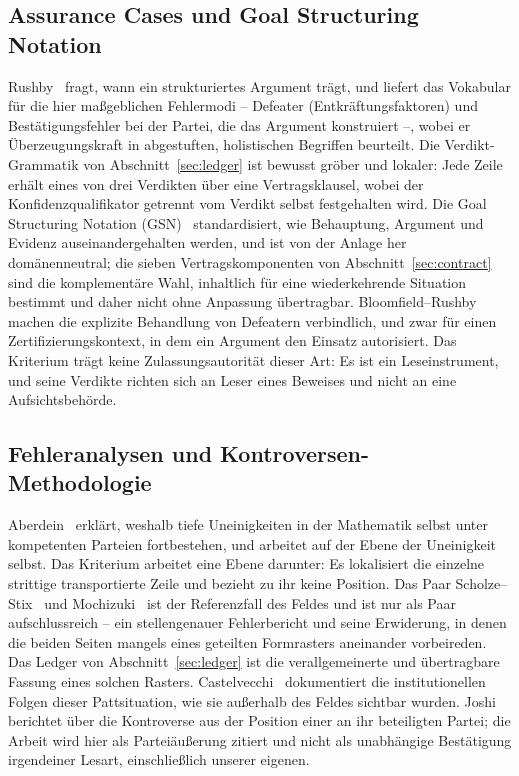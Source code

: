 \documentclass[11pt,a4paper]{article}
\begin{document}
\subsection{Assurance Cases und Goal Structuring Notation}\label{sec:related-assurance}

Rushby~\cite{Rushby2015} fragt, wann ein strukturiertes Argument trägt, und
liefert das Vokabular für die hier maßgeblichen Fehlermodi -- Defeater (Entkräftungsfaktoren) und
Bestätigungsfehler bei der Partei, die das Argument konstruiert --, wobei er
Überzeugungskraft in abgestuften, holistischen Begriffen beurteilt. Die
Verdikt-Grammatik von Abschnitt~\ref{sec:ledger} ist bewusst gröber und
lokaler: Jede Zeile erhält eines von drei Verdikten über eine
Vertragsklausel, wobei der Konfidenzqualifikator getrennt vom Verdikt selbst
festgehalten wird. Die Goal Structuring Notation (GSN)~\cite{GSN2021}
standardisiert, wie Behauptung, Argument und Evidenz auseinandergehalten
werden, und ist von der Anlage her domänenneutral; die sieben
Vertragskomponenten von Abschnitt~\ref{sec:contract} sind die komplementäre
Wahl, inhaltlich für eine wiederkehrende Situation bestimmt und daher nicht
ohne Anpassung übertragbar. Bloomfield--Rushby~\cite{Bloomfield2021} machen
die explizite Behandlung von Defeatern verbindlich, und zwar für einen
Zertifizierungskontext, in dem ein Argument den Einsatz autorisiert. Das
Kriterium trägt keine Zulassungsautorität dieser Art: Es ist ein
Leseinstrument, und seine Verdikte richten sich an Leser eines Beweises und
nicht an eine Aufsichtsbehörde.

\subsection{Fehleranalysen und Kontroversen-Methodologie}\label{sec:related-controversy}

Aberdein~\cite{Aberdein2023} erklärt, weshalb tiefe Uneinigkeiten in der
Mathematik selbst unter kompetenten Parteien fortbestehen, und arbeitet auf
der Ebene der Uneinigkeit selbst. Das Kriterium arbeitet eine Ebene darunter:
Es lokalisiert die einzelne strittige transportierte Zeile und bezieht zu ihr
keine Position. Das Paar Scholze--Stix~\cite{ScholzeStix2018} und
Mochizuki~\cite{Mochizuki2019} ist der Referenzfall des Feldes und ist nur
als Paar aufschlussreich -- ein stellengenauer Fehlerbericht und seine
Erwiderung, in denen die beiden Seiten mangels eines geteilten Formrasters
aneinander vorbeireden. Das Ledger von Abschnitt~\ref{sec:ledger} ist die
verallgemeinerte und übertragbare Fassung eines solchen Rasters.
Castelvecchi~\cite{Castelvecchi2020} dokumentiert die institutionellen Folgen
dieser Pattsituation, wie sie außerhalb des Feldes sichtbar wurden.
Joshi~\cite{Joshi2025Report} berichtet über die Kontroverse aus der Position
einer an ihr beteiligten Partei; die Arbeit wird hier als Parteiäußerung
zitiert und nicht als unabhängige Bestätigung irgendeiner Lesart,
einschließlich unserer eigenen.
\end{document}
